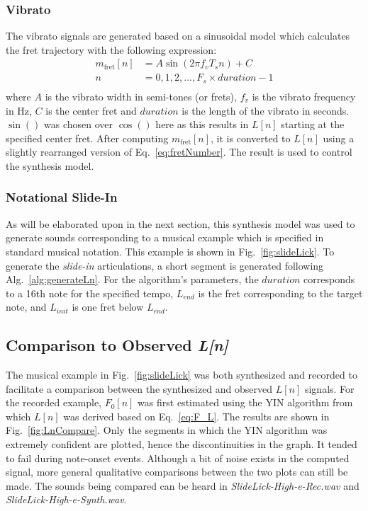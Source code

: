 \documentclass[../main.tex]{subfiles}
\begin{document}
\subsubsection{Vibrato}
The vibrato signals are generated based on a sinusoidal model which calculates the fret trajectory with the following expression:
\begin{align}
    m_{\text{fret}}[n] &= A\sin(2\pi f_v T_s n) + C\\
    n & = 0, 1, 2, ... , F_s\times  duration - 1\\
\end{align}
where $A$ is the vibrato width in semi-tones (or frets), $f_v$ is the vibrato frequency in Hz, $C$ is the center fret and $duration$ is the length of the vibrato in seconds. $\sin()$ was chosen over $\cos()$ here as this results in $L[n]$ starting at the specified center fret. After computing $m_{\text{fret}}[n]$, it is converted to $L[n]$ using a slightly rearranged version of Eq.~\ref{eq:fretNumber}. The result is used to control the synthesis model.

\subsubsection{Notational Slide-In}
As will be elaborated upon in the next section, this synthesis model was used to generate sounds corresponding to a musical example which is specified in standard musical notation. This example is shown in Fig.~\ref{fig:slideLick}. To generate the \emph{slide-in} articulations, a short segment is generated following Alg.~\ref{alg:generateLn}. For the algorithm's parameters, the $duration$ corresponds to a 16th note for the specified tempo, $L_{end}$ is the fret corresponding to the target note, and $L_{init}$ is one fret below $L_{end}$.

\subsection{Comparison to Observed \emph{L[n]}}
The musical example in Fig.~\ref{fig:slideLick} was both synthesized and recorded to facilitate a comparison between the synthesized and observed $L[n]$ signals. For the recorded example, $F_0[n]$ was first estimated using the YIN algorithm  from which $L[n]$ was derived based on Eq.~\ref{eq:F_L}. The results are shown in Fig.~\ref{fig:LnCompare}. Only the segments in which the YIN algorithm was extremely confident are plotted, hence the discontinuities in the graph. It tended to fail during note-onset events. Although a bit of noise exists in the computed signal, more general qualitative comparisons between the two plots can still be made. The sounds being compared can be heard in \emph{SlideLick-High-e-Rec.wav} and \emph{SlideLick-High-e-Synth.wav}.
\end{document}
